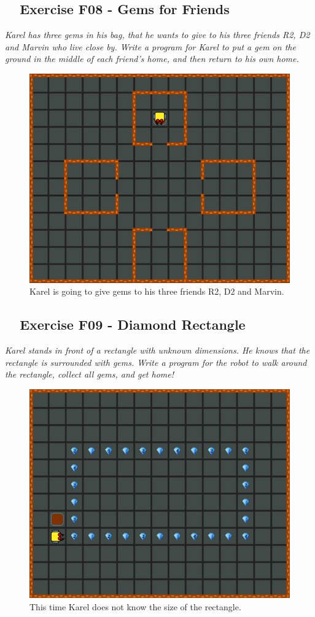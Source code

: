 \documentclass[article,A4,12pt]{llncs}
\begin{document}
{{{{\subsection{\ \ Exercise F08 - Gems for Friends}

{\em Karel has three gems in his bag, that he wants to give to his three friends R2, D2 and Marvin who live close by. Write a program for Karel to put a gem on the ground in the middle of each friend's home, and then return to his own home.}\\[-7mm]


\begin{figure}[!ht]
\begin{center}
\includegraphics[height=0.4\textwidth]{img/f08.png}
\end{center}
\vspace{-4mm}
\caption{Karel is going to give gems to his three friends R2, D2 and Marvin.}
\label{fig:f08}
\vspace{-10mm}
\end{figure}
\noindent
\newpage

\subsection{\ \ Exercise F09 - Diamond Rectangle}

{\em Karel stands in front of a rectangle with unknown dimensions. He knows that the rectangle is surrounded with gems. Write a program for the robot to walk around the rectangle, collect all gems, and get home!}\\[-7mm]


\begin{figure}[!ht]
\begin{center}
\includegraphics[height=0.4\textwidth]{img/f09.png}
\end{center}
\vspace{-4mm}
\caption{This time Karel does not know the size of the rectangle.}
\label{fig:f09}
\vspace{-10mm}
\end{figure}
\noindent

}}}}
\end{document}
